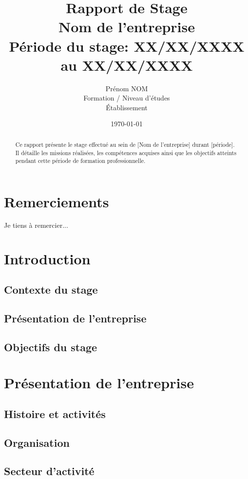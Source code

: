 \documentclass[12pt,a4paper]{report}
\title{
    \huge\textbf{Rapport de Stage}\\
    \vspace{1cm}
    \Large{Nom de l'entreprise}\\
    \vspace{0.5cm}
    \large{Période du stage: XX/XX/XXXX au XX/XX/XXXX}
}
\author{
    \Large{Prénom NOM}\\
    \vspace{0.3cm}
    \large{Formation / Niveau d'études}\\
    \vspace{0.3cm}
    \large{Établissement}
}
\date{\today}
\begin{document}
\maketitle

\begin{abstract}
    \noindent Ce rapport présente le stage effectué au sein de [Nom de l'entreprise] durant [période]. 
    Il détaille les missions réalisées, les compétences acquises ainsi que les objectifs atteints 
    pendant cette période de formation professionnelle.
\end{abstract}

\tableofcontents
\newpage

\chapter*{Remerciements}
Je tiens à remercier...
\newpage

\chapter{Introduction}
\section{Contexte du stage}
\section{Présentation de l'entreprise}
\section{Objectifs du stage}

\chapter{Présentation de l'entreprise}
\section{Histoire et activités}
\section{Organisation}
\section{Secteur d'activité}
\end{document}
